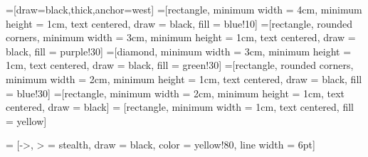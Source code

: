 \documentclass{article}
\begin{document}
	
\thispagestyle{empty} %

=[draw=black,thick,anchor=west]
=[rectangle, minimum width = 4cm, minimum height = 1cm, text centered, draw = black, fill = blue!10]
=[rectangle, rounded corners, minimum width = 3cm, minimum height = 1cm, text centered, draw = black, fill = purple!30]
=[diamond, minimum width = 3cm, minimum height = 1cm, text centered, draw = black, fill = green!30]
=[rectangle, rounded corners, minimum width = 2cm, minimum height = 1cm, text centered, draw = black, fill = blue!30]
=[rectangle, minimum width = 2cm, minimum height = 1cm, text centered, draw = black]
 = [rectangle, minimum width = 1cm, text centered, fill = yellow]

 = [->, > = stealth, draw = black, color = yellow!80, line width = 6pt]
\end{document}
